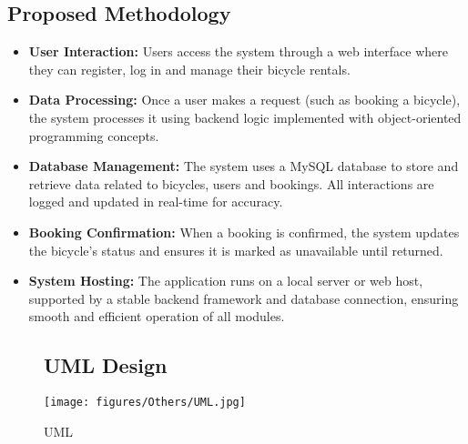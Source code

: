 \subsection{Proposed Methodology}
\begin{itemize}
\item \textbf{User Interaction:} Users access the system through a web interface where they can register, log in and manage their bicycle rentals.
\item \textbf{Data Processing:} Once a user makes a request (such as booking a bicycle), the system processes it using backend logic implemented with object-oriented programming concepts.
\item \textbf{Database Management:} The system uses a MySQL database to store and retrieve data related to bicycles, users and bookings. All interactions are logged and updated in real-time for accuracy.
\item\textbf{Booking Confirmation:} When a booking is confirmed, the system updates the bicycle’s status and ensures it is marked as unavailable until returned.
\item \textbf{System Hosting: } The application runs on a local server or web host, supported by a stable backend framework and database connection, ensuring smooth and efficient operation of all modules.\cite{2.1.1}
\end{itemize}

\begin{figure}[h] %
\subsection{UML Design}
    \centering
    \texttt{[image: figures/Others/UML.jpg]} %
    \caption{UML}
    \label{fig:sample}
\end{figure}



